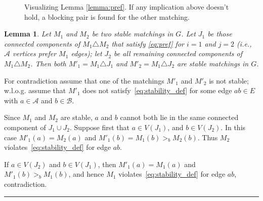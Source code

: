 \documentclass[3p,times]{elsarticle}
\newtheorem{lemma}[fact]{Lemma}
\newenvironment{proof}{{\bf Proof:  }}{\hfill\rule{2mm}{2mm}}
\newcommand{\cA}{\mathcal{A}} \newcommand{\cB}{\mathcal{B}}
\begin{document}
\begin{figure}[H]
\centering
{}
\caption{Visualizing Lemma \ref{lemma:pref}. If any implication above doesn't hold, a blocking pair is found for the other matching.}
\end{figure}

\begin{lemma}\label{lemma:sym_stable} 
  Let $M_1$ and $M_2$ be two stable matchings in $G$. Let $J_1$ be
  those connected components of $M_1 \triangle M_2$ 
  that satisfy
  \eqref{eq:pref} for $i=1$ and $j=2$ (i.e., $\cA$ vertices prefer
  $M_1$ edges); let $J_2$ be all
  remaining connected components of $M_1 \triangle M_2$. 
  Then both $M'_1 = M_1\triangle J_1$ and
  $M'_2=M_1\triangle J_2$ are stable matchings in $G$.
\end{lemma}
\begin{proof}
  For contradiction assume
  that one of the matchings $M'_1$ and $M'_2$ is not stable; w.l.o.g. assume that
  $M'_1$ does not satisfy~\eqref{eq:stability_def} for some edge
  $ab\in E$ with $a\in\mathcal{A}$ and $b\in\mathcal{B}$.

  Since $M_1$ and $M_2$ are stable, $a$ and $b$ cannot both lie in the
  same connected component of $J_1 \cup J_2$. Suppose first that $a \in
  V(J_1)$, and $b \in V(J_2)$. In this case $M'_1(a)=M_2(a)$ and
  $M'_1(b) = M_1(b) >_b M_2(b)$. Thus $M_2$
  violates~\eqref{eq:stability_def} for edge $ab$. 

  If $a\in V(J_2)$
  and $b\in V(J_1)$, then $M'_1(a)=M_1(a)$ and $M'_1(b)>_b M_1(b)$,
  and hence $M_1$ violates~\eqref{eq:stability_def} for edge $ab$,
  contradiction.
\end{proof}
\end{document}
